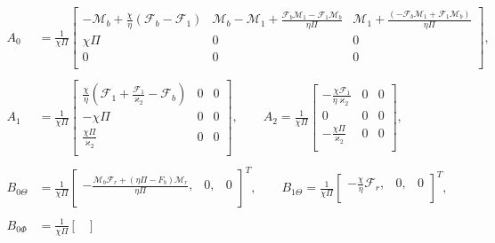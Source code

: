 \documentclass[../main.tex]{subfiles}
\begin{document}
	\begin{align}
		A_{0}&= \frac{1}{\chi\Pi}\begin{bmatrix}
		-\mathcal{M}_b+ \frac{\chi}{\eta}(\mathcal{F}_b-\mathcal{F}_1)     & \mathcal{M}_b-\mathcal{M}_1+\frac{\mathcal{F}_b\mathcal{M}_1-\mathcal{F}_1\mathcal{M}_b}{\eta\Pi}            & \mathcal{M}_1+\frac{(-\mathcal{F}_b\mathcal{M}_1+\mathcal{F}_1\mathcal{M}_b)}{\eta\Pi} \\ 
		\chi\Pi    & 0             & 0            \\
		0     & 0             & 0            \\
		\end{bmatrix}, \nonumber \\\nonumber
		\\ \nonumber
		A_{1}&= \frac{1}{\chi\Pi}\begin{bmatrix}
		\frac{\chi}{\eta}(\mathcal{F}_1+\frac{\mathcal{F}_1}{\varkappa_2}-{\mathcal{F}_b})     & 0             & 0            \\
		-\chi\Pi     & 0             & 0            \\
		\frac{\chi\Pi}{\varkappa_2}    & 0             & 0            \\
		\end{bmatrix}, \qquad
		A_{2}= \frac{1}{\chi\Pi}\begin{bmatrix}
		-\frac{\chi \mathcal{F}_1}{\eta\varkappa_2}     & 0             & 0            \\
		0     & 0             & 0            \\
		-\frac{\chi\Pi}{\varkappa_2}     & 0             & 0            \\
		\end{bmatrix},\nonumber
		\\\nonumber
		\\ \nonumber
		B_{0\Theta}&= \frac{1}{\chi\Pi}\begin{bmatrix}
			- \frac{{{\mathcal{M}_b}{\mathcal{F}_r} + (\eta \Pi  - {F_b}){\mathcal{M}_r}}}{{\eta \Pi }},   & 0,             & 0           \\
		\end{bmatrix}^{T} , \qquad
		B_{1\Theta}= \frac{1}{\chi\Pi}\begin{bmatrix}
		-\frac{\chi}{\eta}\mathcal{F}_r ,    & 0,            & 0            \\
		\end{bmatrix}^{T}, 
		\\\nonumber
		\\ \nonumber
		B_{0\Phi}&= \frac{1}{\chi\Pi}\begin{bmatrix}

\end{bmatrix}
\end{align}
\end{document}
